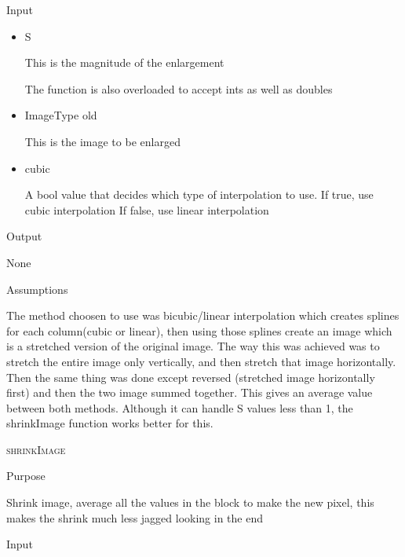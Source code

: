 \documentclass[pdftex, 11pt]{article}
\begin{document}
\begin{description}
\begin{description}
			\item{Input}

				\begin{itemize}

					\item{S}

						This is the magnitude of the enlargement

						The function is also overloaded 
						to accept ints as well as doubles

					\item{ImageType old}

						This is the image to be enlarged

					\item{cubic}

						A bool value that decides which type of
						interpolation to use.
						If true, use cubic interpolation
						If false, use linear interpolation
				\end{itemize}

			\item{Output}

				None

			\item{Assumptions}


				The method choosen to use was bicubic/linear
				interpolation which creates
				splines for each column(cubic or linear),
				then using those splines create an
				image which is a stretched version of the original 
				image.  The way this was achieved
				was to stretch the entire image only vertically,
				and then stretch that
				image horizontally.  Then the same thing was done except
				reversed (stretched image
				horizontally first) and then the two image summed 
				together.  This gives an
				average value between both methods.  Although it can
				handle S values less
				than 1, the shrinkImage function works better for this.

		\end{description}

	\item{\textsc{shrinkImage}}
		\begin{description}
			\item{Purpose}

				Shrink image, average all the values
				in the block to make the new pixel, this
				makes the shrink much less jagged looking in the end

			\item{Input}


\end{description}
\end{description}
\end{document}
